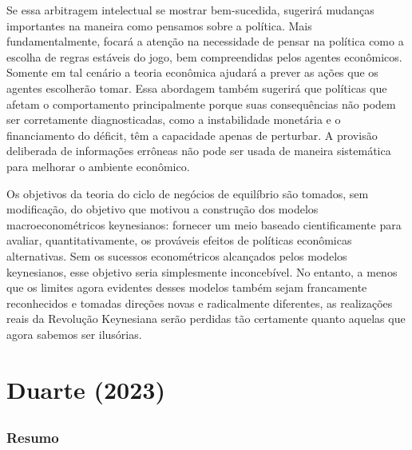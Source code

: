 \documentclass[a4paper,12pt]{article}[abntex2]
\begin{document}
Se essa arbitragem intelectual se mostrar bem-sucedida, sugerirá mudanças importantes na maneira como pensamos sobre a política. Mais fundamentalmente, focará a atenção na necessidade de pensar na política como a escolha de regras estáveis do jogo, bem compreendidas pelos agentes econômicos. Somente em tal cenário a teoria econômica ajudará a prever as ações que os agentes escolherão tomar. Essa abordagem também sugerirá que políticas que afetam o comportamento principalmente porque suas consequências não podem ser corretamente diagnosticadas, como a instabilidade monetária e o financiamento do déficit, têm a capacidade apenas de perturbar. A provisão deliberada de informações errôneas não pode ser usada de maneira sistemática para melhorar o ambiente econômico.

Os objetivos da teoria do ciclo de negócios de equilíbrio são tomados, sem modificação, do objetivo que motivou a construção dos modelos macroeconométricos keynesianos: fornecer um meio baseado cientificamente para avaliar, quantitativamente, os prováveis efeitos de políticas econômicas alternativas. Sem os sucessos econométricos alcançados pelos modelos keynesianos, esse objetivo seria simplesmente inconcebível. No entanto, a menos que os limites agora evidentes desses modelos também sejam francamente reconhecidos e tomadas direções novas e radicalmente diferentes, as realizações reais da Revolução Keynesiana serão perdidas tão certamente quanto aquelas que agora sabemos ser ilusórias.

\section{\textbf{Duarte (2023)}}

\subsection{}

\subsubsection{\textbf{Resumo}}
\end{document}
